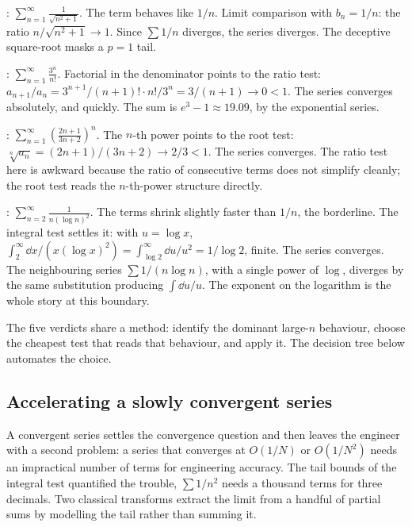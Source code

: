 : $\displaystyle \sum_{n=1}^{\infty}
\frac{1}{\sqrt{n^{2} + 1}}$. The term behaves like $1/n$. Limit
comparison with $b_{n} = 1/n$: the ratio $n/\sqrt{n^{2} + 1} \to 1$.
Since $\sum 1/n$ diverges, the series diverges. The deceptive
square-root masks a $p = 1$ tail.

: $\displaystyle \sum_{n=1}^{\infty}
\frac{3^{n}}{n!}$. Factorial in the denominator points to the ratio
test: $a_{n+1}/a_{n} = 3^{n+1}/(n+1)! \cdot n!/3^{n} = 3/(n+1) \to 0 <
1$. The series converges absolutely, and quickly. The sum is $e^{3} - 1
\approx 19.09$, by the exponential series.

: $\displaystyle \sum_{n=1}^{\infty}
\left(\frac{2n + 1}{3n + 2}\right)^{n}$. The $n$-th power points to the
root test: $\sqrt[n]{a_{n}} = (2n + 1)/(3n + 2) \to 2/3 < 1$. The
series converges. The ratio test here is awkward because the ratio of
consecutive terms does not simplify cleanly; the root test reads the
$n$-th-power structure directly.

: $\displaystyle \sum_{n=2}^{\infty}
\frac{1}{n (\log n)^{2}}$. The terms shrink slightly faster than
$1/n$, the borderline. The integral test settles it: with $u = \log
x$, $\int_{2}^{\infty} \dd x/(x (\log x)^{2}) = \int_{\log 2}^{\infty}
\dd u/u^{2} = 1/\log 2$, finite. The series converges. The neighbouring
series $\sum 1/(n \log n)$, with a single power of $\log$, diverges by
the same substitution producing $\int \dd u/u$. The exponent on the
logarithm is the whole story at this boundary.

The five verdicts share a method: identify the dominant large-$n$
behaviour, choose the cheapest test that reads that behaviour, and
apply it. The decision tree below automates the choice.

\subsection{Accelerating a slowly convergent series}

A convergent series settles the convergence question and then leaves the
engineer with a second problem: a series that converges at $O(1/N)$ or
$O(1/N^{2})$ needs an impractical number of terms for engineering
accuracy. The tail bounds of the integral test quantified the trouble,
$\sum 1/n^{2}$ needs a thousand terms for three decimals. Two classical
transforms extract the limit from a handful of partial sums by modelling
the tail rather than summing it.

